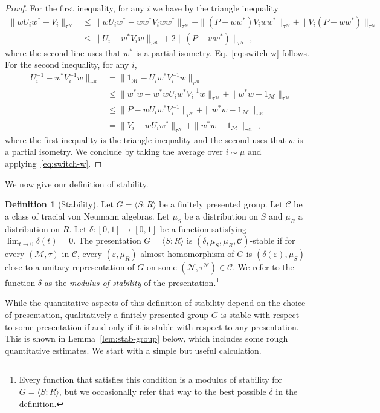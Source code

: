 \documentclass[11pt]{article}
\theoremstyle{definition}
\newtheorem{definition}[theorem]{Definition}
\newcommand{\mC}{\ensuremath{\mathcal{C}}}
\newcommand{\mM}{\ensuremath{\mathcal{M}}}
\newcommand{\cM}{\ensuremath{\mathcal{M}}}
\newcommand{\eps}{\varepsilon}
\newcommand{\mN}{\mathcal{N}}
\begin{document}
\begin{proof}
For the first inequality, for any $i$ we have by the triangle inequality 
\begin{align*}
  \| wU_i w^* - V_i \|_{\tau^\mN} &\leq \| w U_i w^* - w w^* V_i w w^* \|_{\tau^\mN} + \|(P-ww^*)V_i ww^* \|_{\tau^\mN} + \|V_i(P-ww^*)\|_{\tau^\mN}\\
  &\leq \| U_i - w^* V_i w\|_{\tau^\mM} + 2 \|(P-ww^*)\|_{\tau^\mN}\;,
\end{align*}
where the second line uses that $w^*$ is a partial isometry. Eq.~\eqref{eq:switch-w} follows. For the second inequality, for any $i$,
\begin{align*}
  \| U_i^{-1} - w^* V_i^{-1} w \|_{\tau^\mM} &=  \| 1_\mM -  U_i w^* V_i^{-1} w \|_{\tau^\mM}\\
  &\leq \|w^* w - w^* w U_i w^* V_i^{-1} w \|_{\tau^\mM} + \|w^*w-1_\mM\|_{\tau^\mM} \\
&\leq \|P - wU_iw^* V_i^{-1}\|_{\tau^\mN}  + \|w^*w-1_\mM\|_{\tau^\mM} \\
&= \|V_i - wU_iw^* \|_{\tau^\mN}  + \|w^*w-1_\mM\|_{\tau^\mM} \;,
\end{align*}
where the first inequality is the triangle inequality and the second uses that $w$ is a partial isometry. 
We conclude by taking the average over $i\sim \mu$ and applying~\eqref{eq:switch-w}.
\end{proof}


We now give our definition of stability.

\begin{definition}[Stability]\label{def:eff-stab}
Let $G = \langle S:R\rangle $ be a finitely presented group. Let $\mC$ be a class of tracial von Neumann algebras. Let $\mu_S$ be a distribution on $S$ and $\mu_R$ a distribution on $R$. Let $\delta:[0,1]\to[0,1]$ be a function satisfying $\lim_{t\to 0}\delta(t)=0$. The presentation $G=\langle S:R\rangle$ is $(\delta,\mu_S,\mu_R,\mC)$-stable if for every $(\cM,\tau)$ in $\mC$, every $(\eps,\mu_R)$-almost homomorphism of $G$ is $(\delta(\eps),\mu_S)$-close to a unitary representation of $G$ on some $(\mN,\tau^\mN)\in \mC$. We refer to the function $\delta$ as the \emph{modulus of stability} of the presentation.\footnote{Every function that satisfies this condition is a modulus of stability for $G=\langle S\colon R\rangle$, but we occasionally refer that way to the best possible $\delta$ in the definition.} 
\end{definition}

While the quantitative aspects of this definition of stability depend on the choice of presentation, qualitatively a finitely presented group $G$ is stable with respect to some presentation if and only if it is stable with respect to any presentation. This is shown in Lemma~\ref{lem:stab-group} below, which includes some rough quantitative estimates. We start with a simple but useful calculation.
\end{document}

